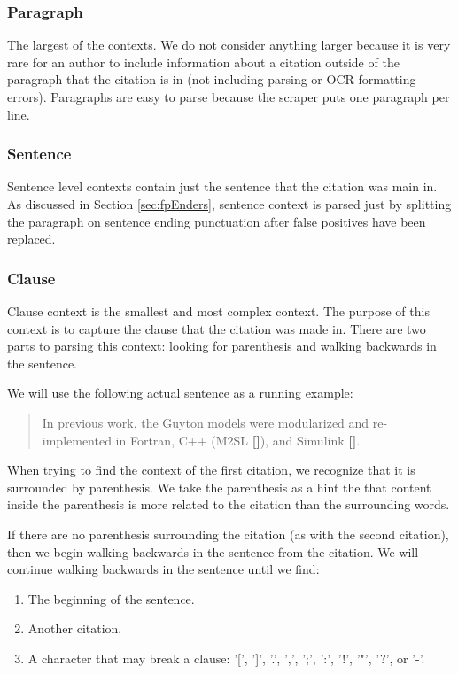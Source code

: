 \documentclass[10pt, conference, compsocconf]{IEEEtran}
\begin{document}
\subsubsection{Paragraph}
The largest of the contexts. We do not consider anything larger because it is very rare for an author to include information about a citation
outside of the paragraph that the citation is in (not including parsing or OCR formatting errors). Paragraphs are easy to parse because the
scraper puts one paragraph per line.

\subsubsection{Sentence}
Sentence level contexts contain just the sentence that the citation was main in. As discussed in Section \ref{sec:fpEnders},
sentence context is parsed just by splitting the paragraph on sentence ending punctuation after false positives have been replaced.

\subsubsection{Clause}
Clause context is the smallest and most complex context. The purpose of this context is to capture the clause that the citation was made in.
There are two parts to parsing this context: looking for parenthesis and walking backwards in the sentence.

We will use the following actual sentence as a running example:
\begin{quote}
In previous work, the Guyton models were modularized and re-implemented in Fortran, C++ (M2SL \textbf{[]}), and Simulink \textbf{[]}.
\end{quote}

When trying to find the context of the first citation, we recognize that it is surrounded by parenthesis.
We take the parenthesis as a hint the that content inside the parenthesis is more related to the citation than the surrounding words.

If there are no parenthesis surrounding the citation (as with the second citation), then we begin walking backwards in the sentence from the citation.
We will continue walking backwards in the sentence until we find:
\begin{enumerate}
   \item The beginning of the sentence.
   \item Another citation.
   \item A character that may break a clause: '[', ']', '.', ',', ';', ':', '!', '"', '?', or '-'.
\end{enumerate}
\end{document}

